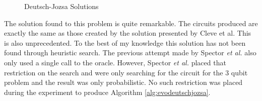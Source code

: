 \begin{figure}
\centering
{}
\caption{Deutsch-Jozsa Solutions}
\end{figure}

The solution found to this problem is quite remarkable.
The circuits produced are exactly the same as those created by the solution presented by Cleve et al\cite{Cleve98quantumalgorithms}.
This is also unprecedented.
To the best of my knowledge this solution has not been found through heuristic search.
The previous attempt made by Spector \emph{et al.}\cite{LSpectorGPforQC,LSpectorANDOR,Spector:1999:QCA:316573.317112} also only used a single call to the oracle.
However, Spector \emph{et al.} placed that restriction on the search and were only searching for the circuit for the 3 qubit problem and the result was only probabilistic.
No such restriction was placed during the experiment to produce Algorithm \ref{alg:evodeutschjozsa}.

